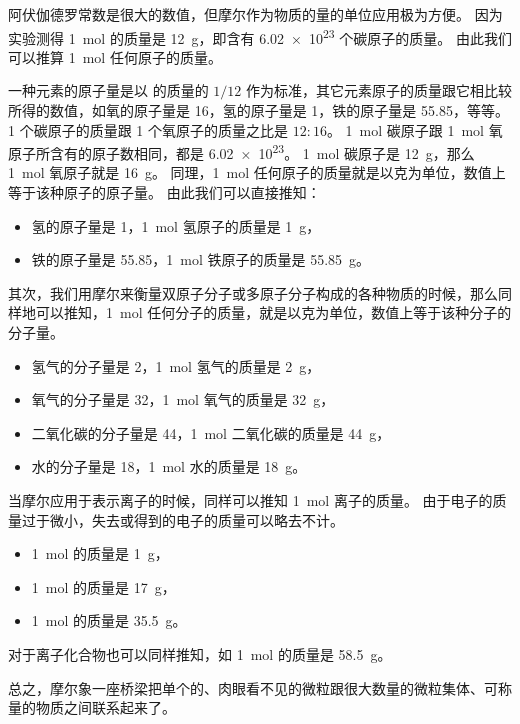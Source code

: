 阿伏伽德罗常数是很大的数值，但摩尔作为物质的量的单位应用极为方便。
因为实验测得 \qty{1}{mol}  的质量是 \qty{12}{g}，即含有 \num{6.02e23} 个碳原子的质量。
由此我们可以推算 \qty{1}{mol} 任何原子的质量。

一种元素的原子量是以  的质量的 $1/12$ 作为标准，其它元素原子的质量跟它相比较所得的数值，如氧的原子量是 16，氢的原子量是 1，铁的原子量是 55.85，等等。
1 个碳原子的质量跟 1 个氧原子的质量之比是 $12:16$。
\qty{1}{mol} 碳原子跟 \qty{1}{mol} 氧原子所含有的原子数相同，都是 \num{6.02e23}。
\qty{1}{mol} 碳原子是 \qty{12}{g}，那么 \qty{1}{mol} 氧原子就是 \qty{16}{g}。
同理，\qty{1}{mol} 任何原子的质量就是以克为单位，数值上等于该种原子的原子量。
由此我们可以直接推知：
\begin{itemize}[label={},labelsep=0pt]
  \item 氢的原子量是 1，\qty{1}{mol} 氢原子的质量是 \qty{1}{g}，
  \item 铁的原子量是 55.85，\qty{1}{mol} 铁原子的质量是 \qty{55.85}{g}。
\end{itemize}

其次，我们用摩尔来衡量双原子分子或多原子分子构成的各种物质的时候，那么同样地可以推知，\qty{1}{mol} 任何分子的质量，就是以克为单位，数值上等于该种分子的分子量。
\begin{itemize}[label={},labelsep=0pt]
  \item 氢气的分子量是 2，\qty{1}{mol} 氢气的质量是 \qty{2}{g}，
  \item 氧气的分子量是 32，\qty{1}{mol} 氧气的质量是 \qty{32}{g}，
  \item 二氧化碳的分子量是 44，\qty{1}{mol} 二氧化碳的质量是 \qty{44}{g}，
  \item 水的分子量是 18，\qty{1}{mol} 水的质量是 \qty{18}{g}。
\end{itemize}

当摩尔应用于表示离子的时候，同样可以推知 \qty{1}{mol} 离子的质量。
由于电子的质量过于微小，失去或得到的电子的质量可以略去不计。
\begin{itemize}[label={},labelsep=0pt]
  \item \qty{1}{mol}  的质量是 \qty{1}{g}，
  \item \qty{1}{mol}  的质量是 \qty{17}{g}，
  \item \qty{1}{mol}  的质量是 \qty{35.5}{g}。
\end{itemize}

对于离子化合物也可以同样推知，如 \qty{1}{mol}  的质量是 \qty{58.5}{g}。

总之，摩尔象一座桥梁把单个的、肉眼看不见的微粒跟很大数量的微粒集体、可称量的物质之间联系起来了。

